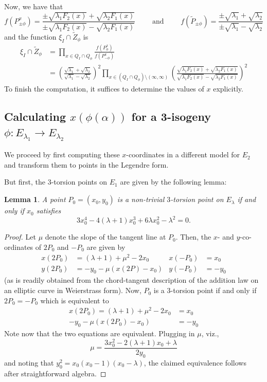 \documentclass[11pt,a4paper]{article}
\newtheorem{lem}[defn]{Lemma}
\begin{document}
Now, we have that
\[f(P_{\pm \phi}^x) = \frac{\pm \sqrt{\lambda_1 F_2(x)} + \sqrt{\lambda_2 F_1(x)} }{\pm \sqrt{\lambda_1 F_2(x)} - \sqrt{\lambda_2 F_1(x)} } \qquad \text{ and }  \qquad f(\widetilde{P}_{\pm \phi}) =  \frac{\pm \sqrt{\lambda_1} + \sqrt{\lambda_2} }{\pm \sqrt{\lambda_1} - \sqrt{\lambda_2} }\]
and the function $\xi_I \cap \widetilde{Z}_\phi$ is
\begin{align}
  \xi_I \cap \widetilde{Z}_\phi &=  \prod_{x \in Q_I \cap Q_\phi} \frac{f(P^x_{\phi})}{f(P^x_{-\phi})} \\
  &= \left(\frac{\sqrt{\lambda_1} + \sqrt{\lambda_2}}{\sqrt{\lambda_1} - \sqrt{\lambda_2}}\right)^2\prod_{x \in (Q_I \cap Q_\phi) \setminus (\infty, \infty)} \left(\frac{\sqrt{\lambda_1 F_2(x)} + \sqrt{\lambda_2 F_1(x)}}{\sqrt{\lambda_1 F_2(x)} - \sqrt{\lambda_2 F_1(x)}}\right)^2 
\end{align}
To finish the computation, it suffices to determine the values of $x$ explicitly.

\subsection{Calculating $x(\phi(\alpha))$ for a 3-isogeny $\phi: E_{\lambda_1} \to E_{\lambda_2}$} We proceed by first computing these $x$-coordinates in a different model for $E_2$ and transform them to points in the Legendre form.

But first, the $3$-torsion points on $E_1$ are given by the following lemma: 

\begin{lem} 
  A point $P_0 = (x_0, y_0)$ is a non-trivial $3$-torsion point on $E_{\lambda}$ if and only if $x_0$ satisfies
  \[3x_0^4 - 4 (\lambda + 1) x_0^3 + 6 \lambda x_0^2 - \lambda^2 = 0.\] 
\end{lem}
\begin{proof}
  Let $\mu$ denote the slope of the tangent line at $P_0$. Then, the $x$- and $y$-co-ordinates of $2P_0$ and $-P_0$ are given by
  \begin{align*}
    x(2P_0) &= (\lambda + 1) + \mu^2 - 2x_0 & x(-P_0) &=  x_0\\
    y(2P_0) &= -y_0 - \mu(x(2P) -  x_0) & y(-P_0)&= -y_0
  \end{align*}
  (as is readily obtained from the chord-tangent description of the addition law on an elliptic curve in Weierstrass form). Now, $P_0$ is a $3$-torsion point if and only if $2P_0 = -P_0$ which is equivalent to
  \begin{align*}
    x(2P_0) = (\lambda + 1) + \mu^2 - 2x_0 &= x_0 \\
     -y_0 - \mu(x(2P_0) -  x_0) &= - y_0 
  \end{align*}
  Note now that the two equations are equivalent. Plugging in $\mu$, viz.,
\[\mu = \frac{3x_0^2 - 2 (\lambda + 1) x_0 + \lambda}{2y_0} \]
 and noting that $y_0^2 = x_0(x_0-1)(x_0 - \lambda)$, the claimed equivalence follows after straightforward algebra. 
\end{proof}
\end{document}

